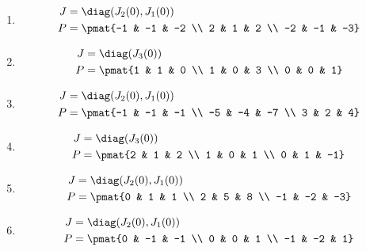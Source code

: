 \begin{enumerate}
\item

\begin{align*}
J &= \diag(J_{2}(0), J_{1}(0))\\
P &= \pmat{-1 & -1 & -2 \\ 2 & 1 & 2 \\ -2 & -1 & -3}
\end{align*}

\item

\begin{align*}
J &= \diag(J_{3}(0))\\
P &= \pmat{1 & 1 & 0 \\ 1 & 0 & 3 \\ 0 & 0 & 1}
\end{align*}

\item

\begin{align*}
J &= \diag(J_{2}(0), J_{1}(0))\\
P &= \pmat{-1 & -1 & -1 \\ -5 & -4 & -7 \\ 3 & 2 & 4}
\end{align*}

\item

\begin{align*}
J &= \diag(J_{3}(0))\\
P &= \pmat{2 & 1 & 2 \\ 1 & 0 & 1 \\ 0 & 1 & -1}
\end{align*}

\item

\begin{align*}
J &= \diag(J_{2}(0), J_{1}(0))\\
P &= \pmat{0 & 1 & 1 \\ 2 & 5 & 8 \\ -1 & -2 & -3}
\end{align*}

\item

\begin{align*}
J &= \diag(J_{2}(0), J_{1}(0))\\
P &= \pmat{0 & -1 & -1 \\ 0 & 0 & 1 \\ -1 & -2 & 1}
\end{align*}


\end{enumerate}
